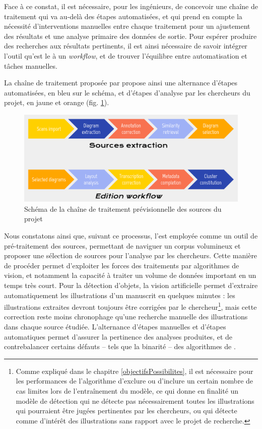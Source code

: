     Face à ce constat, il est nécessaire, pour les ingénieurs, de concevoir une chaîne de traitement qui va au-delà des étapes automatisées, et qui prend en compte la nécessité d'interventions manuelles entre chaque traitement pour un ajustement des résultats et une analyse primaire des données de sortie. Pour espérer produire des recherches aux résultats pertinents, il est ainsi nécessaire de savoir intégrer l'outil qu'est le \dl à un \textit{workflow}, et de trouver l'équilibre entre automatisation et tâches manuelles.
	
	La chaîne de traitement proposée par \eida propose ainsi une alternance d'étapes automatisées, en bleu sur le schéma, et d'étapes d'analyse par les chercheurs du projet, en jaune et orange (fig. \ref{fig:eida_workflow}).
    
    \begin{figure}[h]
    	\centering
    	\includegraphics[width=16cm]{images/eida_workflow.png}
    	\caption{Schéma de la chaîne de traitement prévisionnelle des sources du projet \eida}
    	\label{fig:eida_workflow}
    \end{figure}

	Nous constatons ainsi que, suivant ce processus, l'\ia est employée comme un outil de pré-traitement des sources, permettant de naviguer un corpus volumineux et proposer une sélection de sources pour l'analyse par les chercheurs. Cette manière de procéder permet d'exploiter les forces des traitements par algorithmes de vision, et notamment la capacité à traiter un volume de données important en un temps très court. Pour la détection d'objets, la vision artificielle permet d'extraire automatiquement les illustrations d'un manuscrit en quelques minutes : les illustrations extraites devront toujours être corrigées par le chercheur\footnote{Comme expliqué dans le chapitre \ref{objectifsPossibilites}, il est nécessaire pour les performances de l'algorithme d'exclure ou d'inclure un certain nombre de cas limites lors de l'entraînement du modèle, ce qui donne en finalité un modèle de détection qui ne détecte pas nécessairement toutes les illustrations qui pourraient être jugées pertinentes par les chercheurs, ou qui détecte comme d'intérêt des illustrations sans rapport avec le projet de recherche.}, mais cette correction reste moins chronophage qu'une recherche manuelle des illustrations dans chaque source étudiée. L'alternance d'étapes manuelles et d'étapes automatiques permet d'assurer la pertinence des analyses produites, et de contrebalancer certains défauts -- tels que la binarité -- des algorithmes de \cv.
	
